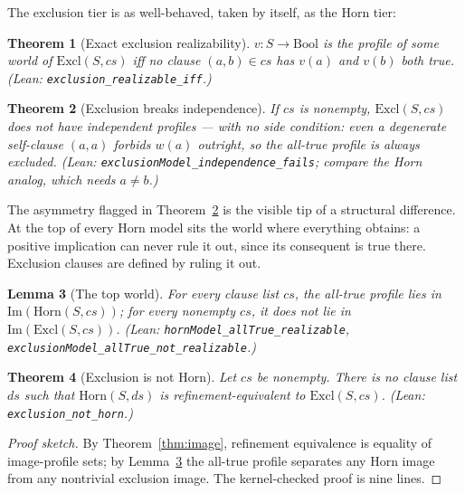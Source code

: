 \documentclass[10pt, letterpaper]{article}
\newtheorem{theorem}{Theorem}[section]
\newtheorem{lemma}[theorem]{Lemma}
\theoremstyle{remark}
\newcommand{\lean}[1]{\texttt{#1}}
\begin{document}
The exclusion tier is as well-behaved, taken by itself, as the Horn tier:

\begin{theorem}[Exact exclusion realizability]\label{thm:excl-boundary}
$v : S \to \mathrm{Bool}$ is the profile of some world of
$\mathrm{Excl}(S, \mathit{cs})$ iff no clause $(a, b) \in \mathit{cs}$ has
$v(a)$ and $v(b)$ both true. (Lean: \lean{exclusion\_realizable\_iff}.)
\end{theorem}

\begin{theorem}[Exclusion breaks independence]\label{thm:excl-indep}
If $\mathit{cs}$ is nonempty, $\mathrm{Excl}(S, \mathit{cs})$ does not have
independent profiles --- with no side condition: even a degenerate
self-clause $(a, a)$ forbids $w(a)$ outright, so the all-true profile is
always excluded. (Lean: \lean{exclusionModel\_independence\_fails}; compare
the Horn analog, which needs $a \neq b$.)
\end{theorem}

The asymmetry flagged in Theorem~\ref{thm:excl-indep} is the visible tip of
a structural difference. At the top of every Horn model sits the world where
everything obtains: a positive implication can never rule it out, since its
consequent is true there. Exclusion clauses are defined by ruling it out.

\begin{lemma}[The top world]\label{lem:top}
For every clause list $\mathit{cs}$, the all-true profile lies in
$\mathrm{Im}(\mathrm{Horn}(S, \mathit{cs}))$; for every \emph{nonempty}
$\mathit{cs}$, it does not lie in $\mathrm{Im}(\mathrm{Excl}(S, \mathit{cs}))$.
(Lean: \lean{hornModel\_allTrue\_realizable},
\lean{exclusionModel\_allTrue\_not\_realizable}.)
\end{lemma}

\begin{theorem}[Exclusion is not Horn]\label{thm:exclusion-not-horn}
Let $\mathit{cs}$ be nonempty. There is no clause list $\mathit{ds}$ such
that $\mathrm{Horn}(S, \mathit{ds})$ is refinement-equivalent to
$\mathrm{Excl}(S, \mathit{cs})$. (Lean: \lean{exclusion\_not\_horn}.)
\end{theorem}

\begin{proof}[Proof sketch]
By Theorem~\ref{thm:image}, refinement equivalence is equality of
image-profile sets; by Lemma~\ref{lem:top} the all-true profile separates
any Horn image from any nontrivial exclusion image. The kernel-checked proof
is nine lines. \end{proof}
\end{document}
